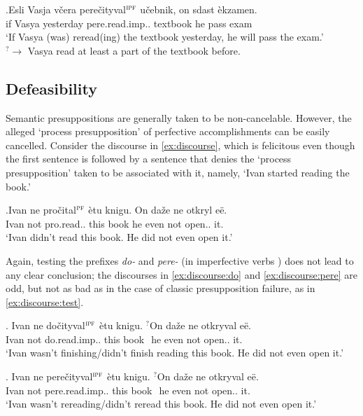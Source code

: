 \exg.\label{ex:cond:pere}Esli Vasja v\v{c}era pere\v{c}ityval$^{\textsc{ipf}}$ u\v{c}ebnik, on sdast \`{e}kzamen.\\
if Vasya yesterday pere.read.imp.. textbook he pass exam\\
\trans `If Vasya (was) reread(ing) the textbook yesterday, he will pass the exam.'\\
$^?\rightarrow$ Vasya read at least a part of the textbook before.


\subsection{Defeasibility}
Semantic presuppositions are generally taken to be non-cancelable. However, the alleged `process presupposition' of perfective accomplishments can be easily cancelled. Consider the discourse in \ref{ex:discourse}, which is felicitous even though the first sentence is followed by a sentence that denies the `process presupposition' taken to be associated with it, namely, `Ivan started reading the book.'

\exg.\label{ex:discourse}Ivan ne pro\v{c}ital$^{\textsc{pf}}$ \`{e}tu knigu. On da\v{z}e ne otkryl e\"{e}.\\
Ivan not pro.read.. this book he even not open.. it.\\
\trans `Ivan didn't read this book. He did not even open it.'

Again, testing the prefixes \textit{do-}   and \textit{pere-}   (in imperfective verbs ) does not lead to any clear conclusion; the discourses in \ref{ex:discourse:do} and \ref{ex:discourse:pere} are odd, but not as bad as in the case of classic presupposition failure, as in \ref{ex:discourse:test}.

\exg. \label{ex:discourse:do}Ivan ne do\v{c}ityval$^{\textsc{ipf}}$ \`{e}tu knigu. $^?$On da\v{z}e ne otkryval e\"{e}.\\
Ivan not do.read.imp.. this book \textcolor{white}{$^?$}he even not open.. it.\\
\trans `Ivan wasn't finishing/didn't finish reading this book. He did not even open it.'

\exg. \label{ex:discourse:pere}Ivan ne pere\v{c}ityval$^{\textsc{ipf}}$ \`{e}tu knigu. $^?$On da\v{z}e ne otkryval e\"{e}.\\
Ivan not pere.read.imp.. this book \textcolor{white}{$^?$}he even not open.. it.\\
\trans `Ivan wasn't rereading/didn't reread this book. He did not even open it.'

